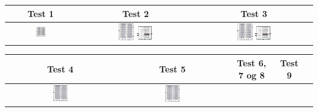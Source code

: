 \documentclass[12pt, a4paper]{article}
\begin{document}
\begin{center}
\begin{tabular}{| c | c | c | }
    \hline
    	Test 1 & Test 2 & Test 3 \\ \hline
	\includegraphics[width=0.14\textwidth]{1.png} &
	\includegraphics[width=0.14\textwidth]{r2.png}
	\includegraphics[width=0.14\textwidth]{2.png} & 
	\includegraphics[width=0.14\textwidth]{3.png}
	\includegraphics[width=0.14\textwidth]{2.png} \\
    \hline
\end{tabular}
\begin{tabular}{| c | c | c | c | c | }
    \hline
    	Test 4 & Test 5 & Test 6, 7 og 8 & Test 9 \\ \hline
	\includegraphics[width=0.14\textwidth]{4.png} &
	\includegraphics[width=0.14\textwidth]{5.png} &

\end{tabular}
\end{center}
\end{document}
